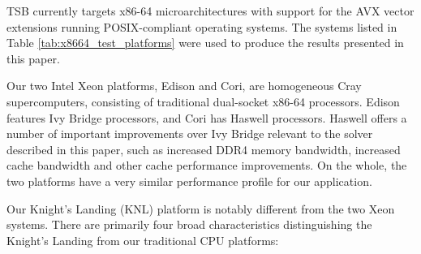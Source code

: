 \documentclass[conference]{IEEEtran}
\begin{document}
TSB currently targets x86-64 microarchitectures with support for the AVX vector
extensions running POSIX-compliant operating systems. The systems listed in
Table \ref{tab:x8664_test_platforms} were used to produce the results presented in
this paper.

Our two Intel Xeon platforms, Edison and Cori, are homogeneous Cray
supercomputers, consisting of traditional dual-socket x86-64 processors. Edison
features Ivy Bridge processors, and Cori has Haswell processors. Haswell offers
a number of important improvements over Ivy Bridge relevant to the solver described
in this paper, such as increased DDR4 memory bandwidth, increased cache bandwidth
and other cache performance improvements. On the whole, the two platforms have
a very similar performance profile for our application.

Our Knight's Landing (KNL) platform is notably different from the two Xeon systems.
There are primarily four broad characteristics distinguishing the Knight's
Landing from our traditional CPU platforms:
\end{document}
